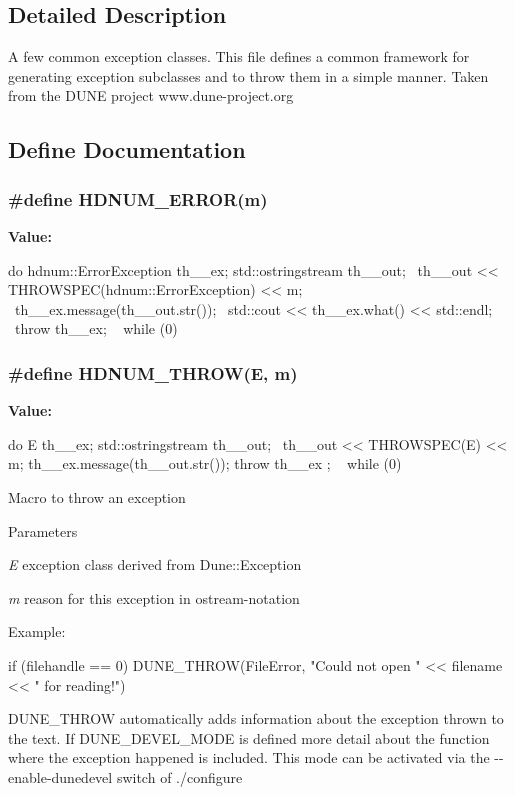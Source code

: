 \subsection{Detailed Description}
A few common exception classes. This file defines a common framework for generating exception subclasses and to throw them in a simple manner. Taken from the DUNE project www.dune-\/project.org 

\subsection{Define Documentation}
\hypertarget{exceptions_8hh_ac5258d45eb46dc2d92f02f0c61bd58f9}{
\subsubsection[{HDNUM\_\-ERROR}]{\setlength{\rightskip}{0pt plus 5cm}\#define HDNUM\_\-ERROR(m)}}
\label{exceptions_8hh_ac5258d45eb46dc2d92f02f0c61bd58f9}
{\bfseries Value:}
\begin{DoxyCode}
do { hdnum::ErrorException th__ex; std::ostringstream th__out;          \
        th__out << THROWSPEC(hdnum::ErrorException) << m; \
        th__ex.message(th__out.str()); \
        std::cout << th__ex.what() << std::endl; \
        throw th__ex;                              \
  } while (0)
\end{DoxyCode}
\hypertarget{exceptions_8hh_a7385bc4ca18aaff3f509a30bde2567c0}{
\subsubsection[{HDNUM\_\-THROW}]{\setlength{\rightskip}{0pt plus 5cm}\#define HDNUM\_\-THROW(E, \/  m)}}
\label{exceptions_8hh_a7385bc4ca18aaff3f509a30bde2567c0}
{\bfseries Value:}
\begin{DoxyCode}
do { E th__ex; std::ostringstream th__out;              \
        th__out << THROWSPEC(E) << m; th__ex.message(th__out.str()); throw th__ex
      ; \
  } while (0)
\end{DoxyCode}
Macro to throw an exception


\begin{DoxyParams}{Parameters}
\item[{\em E}]exception class derived from Dune::Exception \item[{\em m}]reason for this exception in ostream-\/notation\end{DoxyParams}
Example:


\begin{DoxyCode}
        if (filehandle == 0)
    DUNE_THROW(FileError, "Could not open " << filename << " for reading!")
\end{DoxyCode}


DUNE\_\-THROW automatically adds information about the exception thrown to the text. If DUNE\_\-DEVEL\_\-MODE is defined more detail about the function where the exception happened is included. This mode can be activated via the {\ttfamily -\/-\/enable-\/dunedevel} switch of {\ttfamily }./configure 